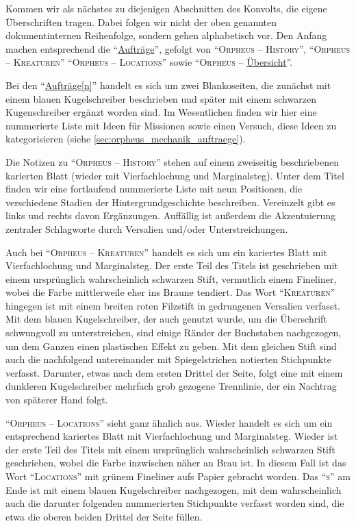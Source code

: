 \documentclass[a5paper,pagesize,numbers=noenddot]{scrbook}
\begin{document}
Kommen wir als nächstes zu diejenigen Abschnitten des Konvolts, die eigene Überschriften tragen.
Dabei folgen wir nicht der oben genannten dokumentinternen Reihenfolge, sondern gehen alphabetisch vor.
Den Anfang machen entsprechend die \enquote{\uline{Aufträge}}, gefolgt von \enquote{\textsc{Orpheus -- History}}, \enquote{\textsc{Orpheus -- Kreaturen}}
\enquote{\textsc{Orpheus -- Locations}} sowie \enquote{\textsc{Orpheus} -- \uline{Übersicht}}.


Bei den \enquote{\uline{Aufträge[n]}} handelt es sich um zwei Blankoseiten, die zunächst mit einem blauen Kugelschreiber beschrieben und später mit einem schwarzen Kugenschreiber ergänzt worden sind.
Im Wesentlichen finden wir hier eine nummerierte Liste mit Ideen für Missionen sowie einen Versuch, diese Ideen zu kategorisieren (siehe \autoref{sec:orpheus_mechanik_auftraege}).


Die Notizen zu \enquote{\textsc{Orpheus -- History}} stehen auf einem zweiseitig beschriebenen karierten Blatt (wieder mit Vierfachlochung und Marginalsteg).
Unter dem Titel finden wir eine fortlaufend nummerierte Liste mit neun Positionen, die verschiedene Stadien der Hintergrundgeschichte beschreiben.
Vereinzelt gibt es links und rechts davon Ergänzungen.
Auffällig ist außerdem die Akzentuierung zentraler Schlagworte durch Versalien und/oder Unterstreichungen.


Auch bei \enquote{\textsc{Orpheus -- Kreaturen}} handelt es sich um ein kariertes Blatt mit Vierfachlochung und Marginalsteg.
Der erste Teil des Titels ist geschrieben mit einem ursprünglich wahrscheinlich schwarzen Stift, vermutlich einem Fineliner, wobei die Farbe mittlerweile eher ins Braune tendiert.
Das Wort \enquote{\textsc{Kreaturen}} hingegen ist mit einem breiten roten Filzstift in gedrungenen Versalien verfasst.
Mit dem blauen Kugelschreiber, der auch genutzt wurde, um die Überschrift schwungvoll zu unterstreichen, sind einige Ränder der Buchstaben nachgezogen, um dem Ganzen einen plastischen Effekt zu geben.
Mit dem gleichen Stift sind auch die nachfolgend untereinander mit Spiegelstrichen notierten Stichpunkte verfasst.
Darunter, etwas nach dem ersten Drittel der Seite, folgt eine mit einem dunkleren Kugelschreiber mehrfach grob gezogene Trennlinie, der ein Nachtrag von späterer Hand folgt.


\enquote{\textsc{Orpheus -- Locations}} sieht ganz ähnlich aus.
Wieder handelt es sich um ein entsprechend kariertes Blatt mit Vierfachlochung und Marginalsteg.
Wieder ist der erste Teil des Titels mit einem ursprünglich wahrscheinlich schwarzen Stift geschrieben, wobei die Farbe inzwischen näher an Brau ist.
In diesem Fall ist das Wort \enquote{\textsc{Locations}} mit grünem Fineliner aufs Papier gebracht worden.
Das \enquote{\textsc{s}} am Ende ist mit einem blauen Kugelschreiber nachgezogen, mit dem wahrscheinlich auch die darunter folgenden nummerierten Stichpunkte verfasst worden sind, die etwa die oberen beiden Drittel der Seite füllen.
\end{document}
